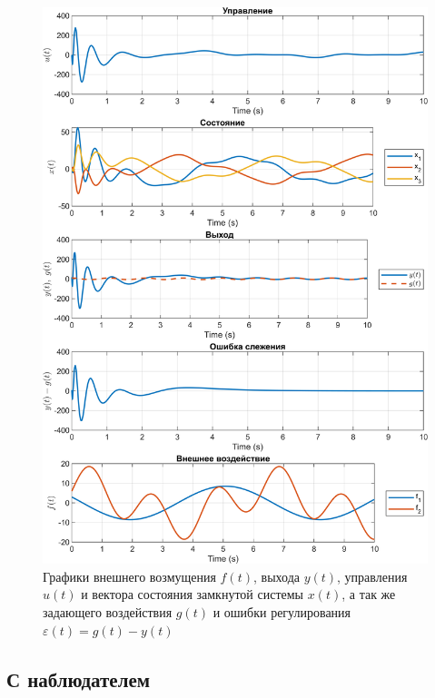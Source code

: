 \begin{figure}[H]
    \centering
    \includegraphics[width=\linewidth]{figs/3_0_sim.png}
    \caption{Графики  внешнего возмущения $f(t)$, выхода
    $y(t)$, управления $u(t)$ и вектора состояния замкнутой системы $x(t)$,
    а так же задающего воздействия $g(t)$ и ошибки регулирования $\varepsilon(t) = g(t) - y(t)$}
    \label{fig:3_0_sim}
\end{figure}


\subsection{С наблюдателем}

